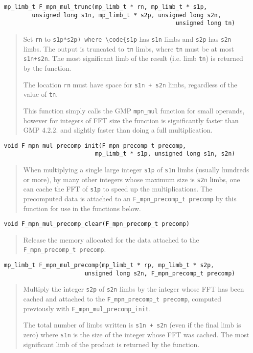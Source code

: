 \documentclass[a4paper,10pt]{article}
\newcommand{\code}{\lstinline}
\begin{document}
\begin{lstlisting}
mp_limb_t F_mpn_mul_trunc(mp_limb_t * rn, mp_limb_t * s1p, 
        unsigned long s1n, mp_limb_t * s2p, unsigned long s2n, 
                                                 unsigned long tn)
\end{lstlisting}
\begin{quote}
Set \code{rn} to \code{s1p*s2p) where \code{s1p} has \code{s1n} limbs and \code{s2p} has \code{s2n} limbs. The output is truncated to \code{tn} limbs, where \code{tn} must be at most \code{s1n+s2n}. The most significant limb of the result (i.e. limb \code{tn}) is returned by the function.

The location \code{rn} must have space for \code{s1n + s2n} limbs, regardless of the value of \code{tn}.

This function simply calls the GMP \code{mpn_mul} function for small operands, however for integers of FFT size the function is significantly faster than GMP 4.2.2. and slightly faster than doing a full multiplication.
\end{quote}

\begin{lstlisting}
void F_mpn_mul_precomp_init(F_mpn_precomp_t precomp, 
                          mp_limb_t * s1p, unsigned long s1n, s2n)
\end{lstlisting}
\begin{quote}
When multiplying a single large integer \code{s1p} of \code{s1n} limbs (usually hundreds or more), by many other integers whose maximum size is \code{s2n} limbs, one can cache the FFT of \code{s1p} to speed up the multiplications. The precomputed data is attached to an \code{F_mpn_precomp_t precomp} by this function for use in the functions below.
\end{quote}

\begin{lstlisting}
void F_mpn_mul_precomp_clear(F_mpn_precomp_t precomp)
\end{lstlisting}
\begin{quote}
Release the memory allocated for the data attached to the \code{F_mpn_precomp_t precomp}.
\end{quote}

\begin{lstlisting}
mp_limb_t F_mpn_mul_precomp(mp_limb_t * rp, mp_limb_t * s2p, 
                       unsigned long s2n, F_mpn_precomp_t precomp)
\end{lstlisting}
\begin{quote}
Multiply the integer \code{s2p} of \code{s2n} limbs by the integer whose FFT has been cached and attached to the \code{F_mpn_precomp_t precomp}, computed previously with \code{F_mpn_mul_precomp_init}. 

The total number of limbs written is \code{s1n + s2n} (even if the final limb is zero) where \code{s1n} is the size of the integer whose FFT was cached. The most significant limb of the product is returned by the function.
\end{quote}
                      
\end{document}
